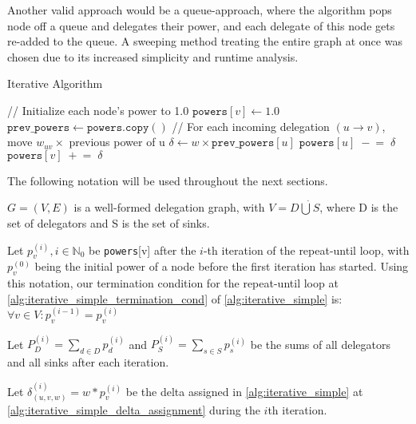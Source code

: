Another valid approach would be a queue-approach, where the algorithm pops node off a queue and delegates their power, and each delegate of this node gets re-added to the queue. A sweeping method treating the entire graph at once was chosen due to its increased simplicity and runtime analysis.

\begin{algorithm} [t]
 \caption{Iterative Algorithm}\label{alg:iterative_simple}
\begin{algorithmic}[1]
\State // Initialize each node’s power to 1.0  
    \State \(\texttt{powers}[v] \gets 1.0\)
\EndFor
\Repeat
    \State \(\texttt{prev\_powers} \gets \texttt{powers}.\texttt{copy}()\)  
        \State // For each incoming delegation \((u \to v)\), move \(w_{uv}\times\) previous power of u
            \State \(\delta \gets w \times \texttt{prev\_powers}[u]\) \label{alg:iterative_simple_delta_assignment}
            \State \(\texttt{powers}[u] \;-\!=\; \delta\) \label{alg:iterative_simple_remove_delta}
            \State \(\texttt{powers}[v] \;+\!=\; \delta\) \label{alg:iterative_simple_add_delta}
        \EndFor
    \EndFor
{} \label{alg:iterative_simple_termination_cond}
\end{algorithmic}
\end{algorithm}

The following notation will be used throughout the next sections.

$G = (V, E)$ is a well-formed delegation graph, with $V = D \dot\bigcup S$, where D is the set of delegators and S is the set of sinks.

Let $p_v^{(i)}, i \in \mathbb{N}_0$ be \texttt{powers}[v] after the $i$-th iteration of the repeat-until loop, with $p_v^{(0)}$ being the initial power of a node before the first iteration has started. Using this notation, our termination condition for the repeat-until loop at \cref{alg:iterative_simple_termination_cond} of \cref{alg:iterative_simple} is: $\forall v \in V: p_v^{(i-1)} = p_v^{(i)}$

Let $P_D^{(i)} = \sum_{d \in D} p_d^{(i)}$ and $P_S^{(i)} = \sum_{s \in S} p_s^{(i)}$ be the sums of all delegators and all sinks after each iteration.

Let $\delta_{(u, v, w)}^{(i)} = w * p_v^{(i)}$ be the delta assigned in \cref{alg:iterative_simple} at \cref{alg:iterative_simple_delta_assignment} during the $i$th iteration.


